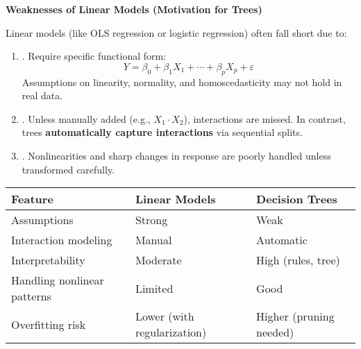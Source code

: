 \begin{flushleft}
    \textcolor{Red2}{ \textbf{Weaknesses of Linear Models (Motivation for Trees)}}
\end{flushleft}
Linear models (like OLS regression or logistic regression) often fall short due to:
\begin{enumerate}
    \item {}. Require specific functional form:
    \begin{equation*}
        Y = \beta_0 + \beta_1 X_1 + \cdots + \beta_p X_p + \varepsilon
    \end{equation*}
    Assumptions on linearity, normality, and homoscedasticity may not hold in real data.
    \item {}. Unless manually added (e.g., $X_1 \cdot X_2$), interactions are missed. In contrast, trees \textbf{automatically capture interactions} via sequential splits.
    \item {}. Nonlinearities and sharp changes in response are poorly handled unless transformed carefully.
\end{enumerate}


\begin{table}[!htp]
    \centering
    \begin{adjustbox}{width={\textwidth},totalheight={\textheight},keepaspectratio}
        \begin{tabular}{@{} l l l @{}}
            \toprule
            \textbf{Feature} & \textbf{Linear Models} & \textbf{Decision Trees} \\
            \midrule
            Assumptions                 & Strong                      & Weak                    \\ [.5em]
            Interaction modeling        & Manual                      & Automatic               \\ [.5em]
            Interpretability            & Moderate                    & High (rules, tree)      \\ [.5em]
            Handling nonlinear patterns & Limited                     & Good                    \\ [.5em]
            Overfitting risk            & Lower (with regularization) & Higher (pruning needed) \\
            \bottomrule
        \end{tabular}
    \end{adjustbox}
\end{table}